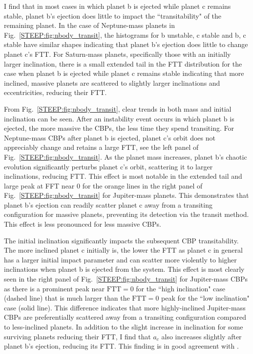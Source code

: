 I find that in most cases in which planet b is ejected while planet c remains stable, planet b's ejection does little to impact the ``transitability" of the remaining planet.  In the case of Neptune-mass planets in Fig.~\ref{STEEP:fig:nbody_transit}, the histograms for b unstable, c stable and b, c stable have similar shapes indicating that planet b's ejection does little to change planet c's FTT.  For Saturn-mass planets, specifically those with an initially larger inclination, there is a small extended tail in the FTT distribution for the case when planet b is ejected while planet c remains stable indicating that more inclined, massive planets are scattered to slightly larger inclinations and eccentricities, reducing their FTT.  

From Fig.~\ref{STEEP:fig:nbody_transit}, clear trends in both mass and initial inclination can be seen.  After an instability event occurs in which planet b is ejected, the more massive the CBPs, the less time they spend transiting.  For Neptune-mass CBPs after planet b is ejected, planet c's orbit does not appreciably change and retains a large FTT, see the left panel of Fig.~\ref{STEEP:fig:nbody_transit}.  As the planet mass increases, planet b's chaotic evolution significantly perturbs planet c's orbit, scattering it to larger inclinations, reducing FTT.  This effect is most notable in the extended tail and large peak at FFT near 0 for the orange lines in the right panel of Fig.~\ref{STEEP:fig:nbody_transit} for Jupiter-mass planets.  This demonstrates that planet b's ejection can readily scatter planet c away from a transiting configuration for massive planets, preventing its detection via the transit method.  This effect is less pronounced for less massive CBPs.

The initial inclination significantly impacts the subsequent CBP transitability.  The more inclined planet c initially is, the lower the FTT as planet c in general has a larger initial impact parameter and can scatter more violently to higher inclinations when planet b is ejected from the system.  This effect is most clearly seen in the right panel of Fig.~\ref{STEEP:fig:nbody_transit} for Jupiter-mass CBPs as there is a prominent peak near $\text{FTT}= 0$ for the ``high inclination" case (dashed line) that is much larger than the $\text{FTT}=0$ peak for the ``low inclination" case (solid line).  This difference indicates that more highly-inclined Jupiter-mass CBPs are preferentially scattered away from a transiting configuration compared to less-inclined planets.  In addition to the slight increase in inclination for some surviving planets reducing their FTT, I find that $a_c$ also increases slightly after planet b's ejection, reducing its FTT.  This finding is in good agreement with \citet{Gong2017}.

